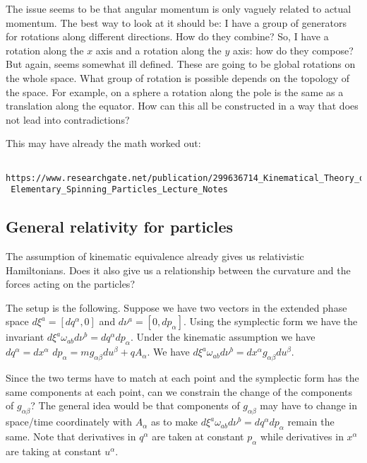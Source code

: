 \documentclass[11pt,letterpaper,fleqn]{memoir} %
\begin{document}
The issue seems to be that angular momentum is only vaguely related to actual momentum. The best way to look at it should be: I have a group of generators for rotations along different directions. How do they combine? So, I have a rotation along the $x$ axis and a rotation along the $y$ axis: how do they compose? But again, seems somewhat ill defined. These are going to be global rotations on the whole space. What group of rotation is possible depends on the topology of the space. For example, on a sphere a rotation along the pole is the same as a translation along the equator. How can this all be constructed in a way that does not lead into contradictions?

This may have already the math worked out:
\begin{verbatim}
 https://www.researchgate.net/publication/299636714_Kinematical_Theory_of_
 Elementary_Spinning_Particles_Lecture_Notes
\end{verbatim}

\subsection{General relativity for particles}

The assumption of kinematic equivalence already gives us relativistic Hamiltonians. Does it also give us a relationship between the curvature and the forces acting on the particles?

The setup is the following. Suppose we have two vectors in the extended phase space $d\xi^a = [dq^\alpha, 0]$ and $d\nu^a = [0, dp_\alpha]$. Using the symplectic form we have the invariant $d\xi^a \omega_{ab}d\nu^b = dq^\alpha dp_\alpha$. Under the kinematic assumption we have $dq^\alpha = dx^\alpha$ $dp_\alpha = mg_{\alpha\beta}du^\beta + q A_\alpha$. We have $d\xi^a \omega_{ab}d\nu^b = dx^\alpha g_{\alpha\beta} du^\beta$.

Since the two terms have to match at each point and the symplectic form has the same components at each point, can we constrain the change of the components of $g_{\alpha\beta}$? The general idea would be that components of $g_{\alpha\beta}$ may have to change in space/time coordinately with $A_\alpha$ as to make $d\xi^a \omega_{ab}d\nu^b = dq^\alpha dp_\alpha$ remain the same. Note that derivatives in $q^\alpha$ are taken at constant $p_\alpha$ while derivatives in $x^\alpha$ are taking at constant $u^\alpha$.



\backmatter
\end{document}
